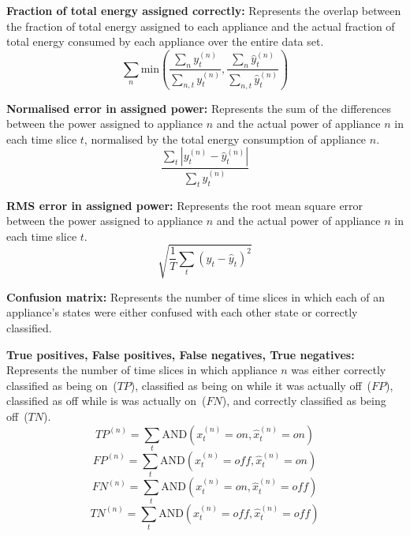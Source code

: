 \documentclass{sig-alternate}
\begin{document}
\textbf{Fraction of total energy assigned correctly:} Represents the overlap between the fraction of total energy assigned to each appliance and the actual fraction of total energy consumed by each appliance over the entire data set.
\begin{equation}
        \sum_n \mathrm{min} \left ( 
        \frac{\sum_n y^{(n)}_t}{\sum_{n,t} y^{(n)}_t}, 
        \frac{\sum_n \hat{y}^{(n)}_t}{\sum_{n,t} \hat{y}^{(n)}_t} 
        \right )
\end{equation}

\textbf{Normalised error in assigned power:} Represents the sum of the differences between the power assigned to appliance $n$ and the actual power of appliance $n$ in each time slice $t$, normalised by the total energy consumption of appliance $n$.
\begin{equation}
        \frac
        { \sum_t {\left | y_t^{(n)} - \hat{y}_t^{(n)} \right |} }
        { \sum_t y_t^{(n)} }
\end{equation}

\textbf{RMS error in assigned power:} Represents the root mean square error between the power assigned to appliance $n$ and the actual power of appliance $n$ in each time slice $t$.
\begin{equation}
\sqrt{ \frac{1}{T} \sum_t{ \left ( y_t - \hat{y}_t \right )^2 } }
\end{equation}

\textbf{Confusion matrix:} Represents the number of time slices in which each of an appliance's states were either confused with each other state or correctly classified.

\textbf{True positives, False positives, False negatives, True negatives:} Represents the number of time slices in which appliance $n$ was either correctly classified as being on~($\mathit{TP}$), classified as being on while it was actually off~($\mathit{FP}$), classified as off while is was actually on~($\mathit{FN}$), and correctly classified as being off~($\mathit{TN}$).
\begin{equation}
\mathit{TP}^{(n)} = 
\sum_{t}
\mathrm{AND} \left ( x^{(n)}_t = \mathit{on}, \hat{x}^{(n)}_t = \mathit{on} \right )
\end{equation}
\begin{equation}
\mathit{FP}^{(n)} = 
\sum_{t}
\mathrm{AND} \left ( x^{(n)}_t = \mathit{off}, \hat{x}^{(n)}_t = \mathit{on} \right )
\end{equation}
\begin{equation}
\mathit{FN}^{(n)} = 
\sum_{t}
\mathrm{AND} \left ( x^{(n)}_t = \mathit{on}, \hat{x}^{(n)}_t = \mathit{off} \right )
\end{equation}
\begin{equation}
\mathit{TN}^{(n)} = 
\sum_{t}
\mathrm{AND} \left ( x^{(n)}_t = \mathit{off}, \hat{x}^{(n)}_t = \mathit{off} \right )
\end{equation}
\end{document}
